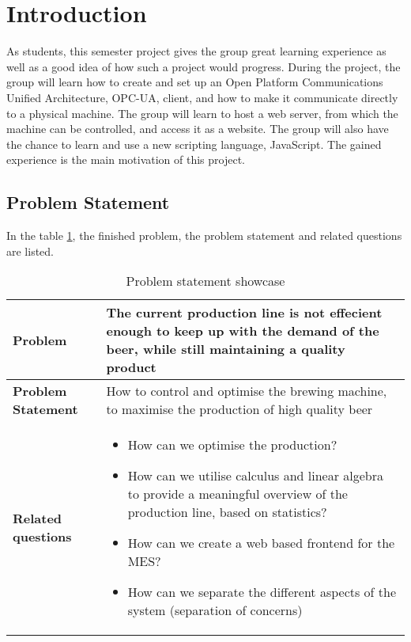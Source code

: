 \section{Introduction}

As students, this semester project gives the group great learning experience as
well as a good idea of how such a project would progress. During the project,
the group will learn how to create and set up an Open Platform Communications
Unified Architecture, OPC-UA, client, and how to make it communicate directly
to a physical machine. The group will learn to host a web server, from which the
machine can be controlled, and access it as a website. The group will also have
the chance to learn and use a new scripting language, JavaScript. The gained
experience is the main motivation of this project.

\subsection{Problem Statement}
In the table \ref{table:problem-statement}, the finished problem, the problem statement and related questions are listed.
\begin{table}[ht]
    \begin{tabularx}{\textwidth}{|>{\RaggedRight}p{4cm}|>{\RaggedRight}X|}
        \hline
        \textbf{Problem} & The current production line is not effecient enough to keep up with the demand of the beer, while still maintaining a quality product\\
        \hline
        \textbf{Problem Statement} & How to control and optimise the brewing machine, to maximise the production of high quality beer\\
        \hline
        \textbf{Related questions} & 
            \begin{itemize}
                \item How can we optimise the production?
                \item How can we utilise calculus and linear algebra to provide a meaningful overview of the production line, based on statistics?
                \item How can we create a web based frontend for the MES?
                \item How can we separate the different aspects of the system (separation of concerns)
            \end{itemize}
        \hline
    \end{tabularx}
    \caption{Problem statement showcase} 
    \label{table:problem-statement}
\end{table} 

